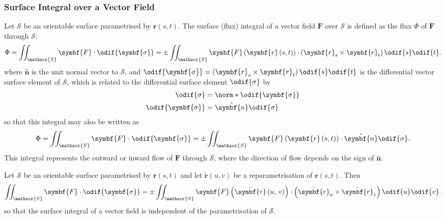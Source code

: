 \documentclass{article}
\begin{document}
\subsubsection{Surface Integral over a Vector Field}
Let \(\mathscr{S}\) be an orientable surface parametrised by
\(\symbf{r}\left( s, t \right)\). The surface (flux) integral of a
vector field \(\symbf{F}\) over \(\mathscr{S}\) is defined as the flux
\(\Phi\) of \(\symbf{F}\) through \(\mathscr{S}\):
\begin{equation*}
    \Phi =
    \iint_{\mathscr{S}} \symbf{F} \cdot \odif{\symbf{\sigma}} =
    \pm \iint_{\mathscr{S}} \symbf{F}\left( \symbf{r}\left( s, t \right) \right) \cdot \left( \symbf{r}_s \times \symbf{r}_t \right) \odif{s} \odif{t}.
\end{equation*}
where \(\hat{\symbf{n}}\) is the unit normal vector to \(\mathscr{S}\),
and \(\odif{\symbf{\sigma}} = \left( \symbf{r}_s \times \symbf{r}_t \right) \odif{s}\odif{t}\)
is the differential vector surface element of \(\mathscr{S}\), which is
related to the differential surface element \(\odif{\sigma}\) by
\begin{align*}
    \odif{\sigma}         & = \norm*{\odif{\symbf{\sigma}}} \\
    \odif{\symbf{\sigma}} & = \hat{\symbf{n}} \odif{\sigma}
\end{align*}
so that this integral may also be written as
\begin{equation*}
    \Phi =
    \iint_{\mathscr{S}} \symbf{F} \cdot \odif{\symbf{\sigma}} =
    \pm \iint_{\mathscr{S}} \symbf{F}\left( \symbf{r}\left( s, t \right) \right) \cdot \hat{\symbf{n}} \odif{\sigma}.
\end{equation*}
This integral represents the outward or inward flow of \(\symbf{F}\)
through \(\mathscr{S}\), where the direction of flow depends on the sign
of \(\hat{\symbf{n}}\).
\begin{lemma}
    Let \(\mathscr{S}\) be an orientable surface parametrised by \(\symbf{r}\left( s, t \right)\)
    and let \(\tilde{\symbf{r}}\left( u, v \right)\) be a reparametrisation
    of \(\symbf{r}\left( s, t \right)\). Then
    \begin{equation*}
        \iint_{\mathscr{S}} \symbf{F} \cdot \odif{\symbf{\sigma}} = \pm \iint_{\mathscr{S}} \symbf{F}\left( \tilde{\symbf{r}}\left( u,\: v \right) \right) \cdot \left( \tilde{\symbf{r}}_u \times \tilde{\symbf{r}}_v \right) \odif{u} \odif{v}.
    \end{equation*}
    so that the surface integral of a vector field is independent of the
    parametrisation of \(\mathscr{S}\).
\end{lemma}
\end{document}
